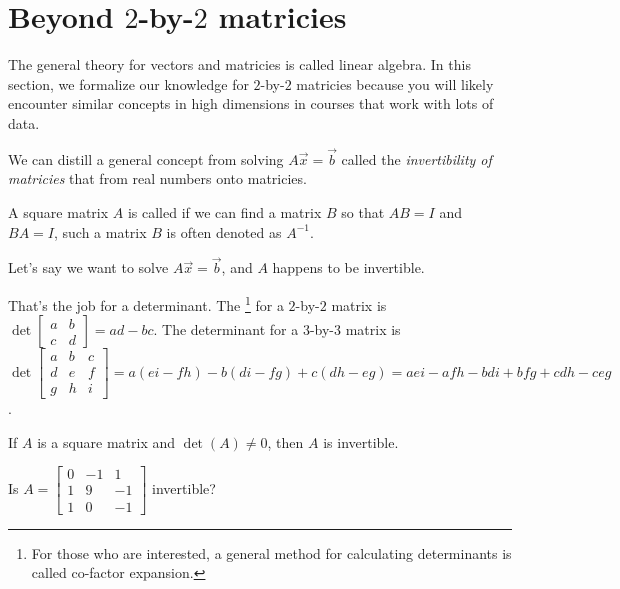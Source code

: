 \documentclass[../main.tex]{subfiles}
\begin{document}
 \section{Beyond \texorpdfstring{\(2\)-by-\(2\)}{2-by-2} matricies}

The general theory for vectors and matricies is called linear algebra. In this section, we formalize our knowledge for \(2\)-by-\(2\) matricies because you will likely encounter similar concepts in high dimensions in courses that work with lots of data. 

We can distill a general concept from solving \(A \vec{x} = \vec{b}\) called the \emph{invertibility of matricies} that  from real numbers onto matricies.

\faStar{} A square matrix \(A\) is called  if we can find a matrix \(B\) so that \(AB = I\) and \(BA = I\), such a matrix \(B\) is often denoted as \(A^{-1}\). 

  Let's say we want to solve \(A \vec{x} = \vec{b}\), and \(A\) happens to be invertible. 


 That's the job for a determinant. The \footnote{For those who are interested, a general method for calculating determinants is called co-factor expansion.} for a \(2\)-by-\(2\) matrix is \(\det \begin{bmatrix} a & b \\ c & d \end{bmatrix} = ad - bc\).  The determinant for a \(3\)-by-\(3\) matrix is \(\det \begin{bmatrix} a & b & c \\ d & e & f \\ g & h & i\end{bmatrix} = a (ei - fh) - b (di - fg) + c (dh - eg) = aei - afh - bdi + bfg + cdh - ceg \). 


\faStar{} If \(A\) is a square matrix and \(\det(A) \ne 0\), then \(A\) is invertible. 

\begin{example}
  Is \(A = \begin{bmatrix} 0 & -1 & 1 \\ 1 & 9 & -1 \\ 1 & 0 & -1\end{bmatrix}\) invertible?

  \blanks*
\end{example}
\clearpage
\end{document}
